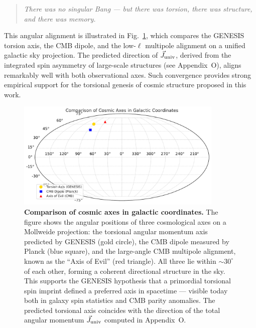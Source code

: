 \documentclass{article}
\begin{document}
\begin{quote}
\emph{There was no singular Bang --- but there was torsion, there was structure, and there was memory.}
\end{quote}

This angular alignment is illustrated in Fig.~\ref{fig:cosmic_axes}, which compares the GENESIS torsion axis, the CMB dipole, and the low-$\ell$ multipole alignment on a unified galactic sky projection.
The predicted direction of $\vec{J}_{\rm univ}$, derived from the integrated spin asymmetry of large-scale structures (see Appendix~O), aligns remarkably well with both observational axes.
Such convergence provides strong empirical support for the torsional genesis of cosmic structure proposed in this work.

\begin{figure}[h!]
    \centering
    \includegraphics[width=0.88\textwidth]{Fig_AA1_cosmic_axes.pdf}
    \caption{
    \textbf{Comparison of cosmic axes in galactic coordinates.} 
    The figure shows the angular positions of three cosmological axes on a Mollweide projection:
    the torsional angular momentum axis predicted by GENESIS (gold circle), the CMB dipole measured by Planck (blue square), and the large-angle CMB multipole alignment, known as the ``Axis of Evil'' (red triangle). 
    All three lie within $\sim30^\circ$ of each other, forming a coherent directional structure in the sky. 
    This supports the GENESIS hypothesis that a primordial torsional spin imprint defined a preferred axis in spacetime --- visible today both in galaxy spin statistics and CMB parity anomalies. 
    The predicted torsional axis coincides with the direction of the total angular momentum $\vec{J}_{\rm univ}$ computed in Appendix~O.
    }
    \label{fig:cosmic_axes}
\end{figure}
\end{document}
